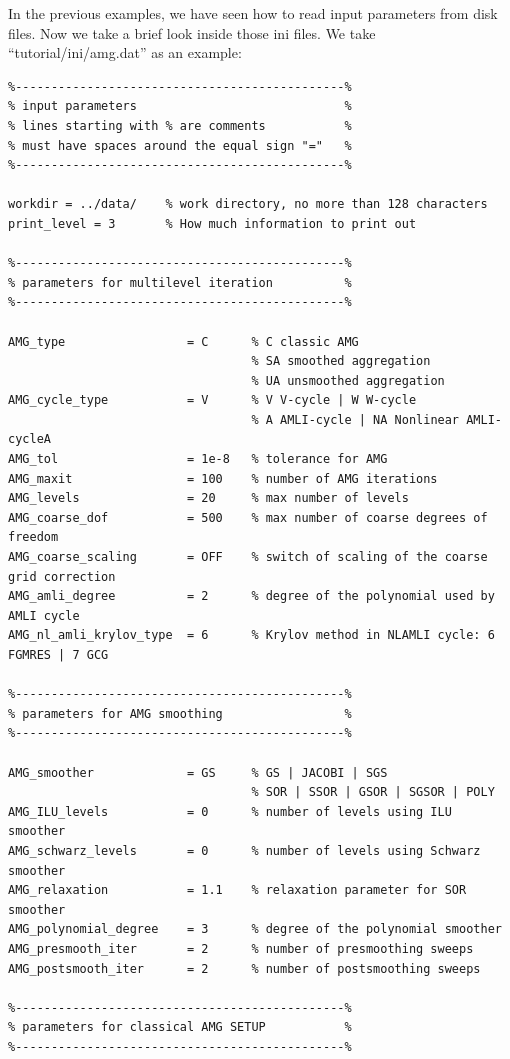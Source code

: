 \documentclass[11pt]{memoir}
\begin{document}
In the previous examples, we have seen how to read input parameters from disk files. Now we take a brief look inside those ini files. We take ``tutorial/ini/amg.dat'' as an example:
%
\begin{lstlisting}
%----------------------------------------------%
% input parameters                             %
% lines starting with % are comments           %
% must have spaces around the equal sign "="   %
%----------------------------------------------%

workdir = ../data/    % work directory, no more than 128 characters
print_level = 3       % How much information to print out

%----------------------------------------------%
% parameters for multilevel iteration          %
%----------------------------------------------%

AMG_type                 = C      % C classic AMG
                                  % SA smoothed aggregation
                                  % UA unsmoothed aggregation
AMG_cycle_type           = V      % V V-cycle | W W-cycle
                                  % A AMLI-cycle | NA Nonlinear AMLI-cycleA
AMG_tol                  = 1e-8   % tolerance for AMG
AMG_maxit                = 100    % number of AMG iterations
AMG_levels               = 20     % max number of levels
AMG_coarse_dof           = 500    % max number of coarse degrees of freedom
AMG_coarse_scaling       = OFF    % switch of scaling of the coarse grid correction
AMG_amli_degree          = 2      % degree of the polynomial used by AMLI cycle
AMG_nl_amli_krylov_type  = 6      % Krylov method in NLAMLI cycle: 6 FGMRES | 7 GCG

%----------------------------------------------%
% parameters for AMG smoothing                 %
%----------------------------------------------%

AMG_smoother             = GS     % GS | JACOBI | SGS
                                  % SOR | SSOR | GSOR | SGSOR | POLY
AMG_ILU_levels           = 0      % number of levels using ILU smoother
AMG_schwarz_levels       = 0      % number of levels using Schwarz smoother
AMG_relaxation           = 1.1    % relaxation parameter for SOR smoother
AMG_polynomial_degree    = 3      % degree of the polynomial smoother
AMG_presmooth_iter       = 2      % number of presmoothing sweeps
AMG_postsmooth_iter      = 2      % number of postsmoothing sweeps

%----------------------------------------------%
% parameters for classical AMG SETUP           %
%----------------------------------------------%


\end{lstlisting}
\end{document}
